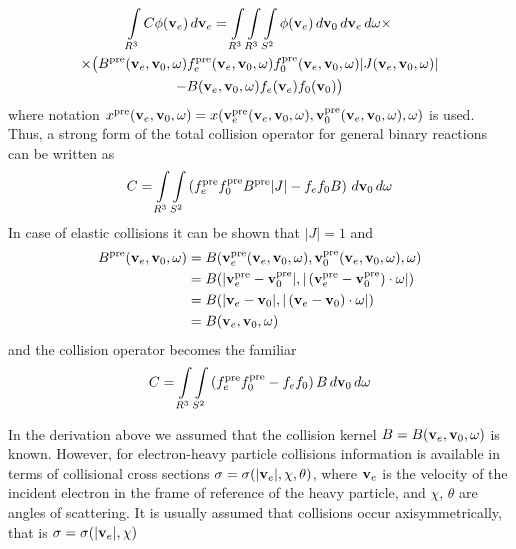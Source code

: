 \documentclass{article}
\begin{document}
\begin{multline*}
\myint_{R^3} C \phi\of{\vect{v}_e} \diff{\vect{v}_e} 
=
\myint_{R^3} \myint_{R^3} \myint_{S^2} 
\phi\of{\vect{v}_e} 
\diff{\vect{v}_0} \diff{\vect{v}_e} \diff{\vect{\omega}}
\times
\\
\times
\big(
B^\text{pre}\of{\vect{v}_e, \vect{v}_0, \vect{\omega}}  
f_e^\text{pre}\of{\vect{v}_e, \vect{v}_0, \vect{\omega}}
f_0^\text{pre}\of{\vect{v}_e, \vect{v}_0, \vect{\omega}} 
|J\of{\vect{v}_e, \vect{v}_0, \vect{\omega}}|
\\
-
B\of{\vect{v}_e, \vect{v}_0, \vect{\omega}} 
f_e\of{\vect{v}_e} f_0\of{\vect{v}_0} 
\big)
\end{multline*}
where notation $x^\text{pre}\of{\vect{v}_e, \vect{v}_0, \vect{\omega}} = x\of{\vect{v}_e^\text{pre} \of{\vect{v}_e, \vect{v}_0, \vect{\omega}}, \vect{v}_0^\text{pre} \of{\vect{v}_e, \vect{v}_0, \vect{\omega}}, \vect{\omega}}$ is used. Thus, a strong form of the total collision operator for general binary reactions can be written as
\begin{align*}
C = 
\int\limits_{R^3} \int\limits_{S^2} 
\left(
f_e^\text{pre}
f_0^\text{pre}
B^\text{pre} 
|J|
-
f_e
f_0
B
\right)
\, d\mathbf{v}_0 \, d\mathbf{\omega}
\end{align*}
In case of elastic collisions it can be shown that $|J| = 1$ and
\begin{align*}
B^\text{pre}\of{\vect{v}_e, \vect{v}_0, \vect{\omega}} &=
B\of{\vect{v}_e^\text{pre} \of{\vect{v}_e, \vect{v}_0, \vect{\omega}}, \vect{v}_0^\text{pre} \of{\vect{v}_e, \vect{v}_0, \vect{\omega}}, \vect{\omega}} 
\\
&=
B\of{|\vect{v}_e^\text{pre}- \vect{v}_0^\text{pre}|, |\left(\vect{v}_e^\text{pre}- \vect{v}_0^\text{pre}\right)\cdot\vect{\omega}|} 
\\
&=
B\of{|\vect{v}_e- \vect{v}_0|, |\left(\vect{v}_e- \vect{v}_0\right)\cdot\vect{\omega}|}
\\
&=
B\of{\vect{v}_e, \vect{v}_0, \vect{\omega}} 
\end{align*}
and the collision operator becomes the familiar
\begin{align*}
C = 
\int\limits_{R^3} \int\limits_{S^2} 
\left(
f_e^\text{pre}
f_0^\text{pre}
-
f_e
f_0
\right)
B
\, d\mathbf{v}_0 \, d\mathbf{\omega}
\end{align*}

In the derivation above we assumed that the collision kernel $B=B\of{\vect{v}_e, \vect{v}_0, \vect{\omega}}$ is known. However, for electron-heavy particle collisions information is available in terms of collisional cross sections $\sigma = \sigma\of{|\vect{v}_e|, \chi, \theta}$, where $\mathbf{v}_e$ is the velocity of the incident electron in the frame of reference of the heavy particle, and $\chi$, $\theta$ are angles of scattering. It is usually assumed that collisions occur axisymmetrically, that is $\sigma = \sigma\of{|\vect{v}_e|, \chi}$
\end{document}
